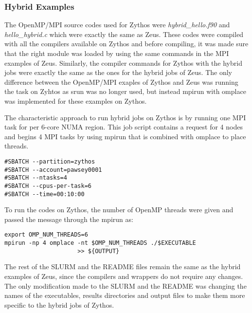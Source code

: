 \subsubsection{Hybrid Examples}

The OpenMP/MPI source codes used for Zythos were \emph{hybrid\_hello.f90} and \emph{hello\_hybrid.c} which were exactly the same as Zeus. These codes 
were compiled with all the compilers available on Zythos and before compiling, it was made sure that the right module was loaded by using the same 
commands in the MPI examples of Zeus. Similarly, the compiler commands for Zythos with the hybrid jobs were exactly the same as the ones for the hybrid 
jobs of Zeus. The only difference between the OpenMP/MPI exaples of Zythos and Zeus was running the task on Zyhtos as srun was no longer used, but 
instead mpirun with omplace was implemented for these examples on Zythos. 

The characteristic approach to run hybrid jobs on Zythos is by running one MPI task for per 6-core NUMA region. This job script contains a request for 4
nodes and begins 4 MPI tasks by using mpirun that is combined with omplace to place threads.

\begin{tcolorbox}
\begin{Verbatim}[fontsize=\scriptsize]
#SBATCH --partition=zythos
#SBATCH --account=pawsey0001
#SBATCH --ntasks=4
#SBATCH --cpus-per-task=6
#SBATCH --time=00:10:00
\end{Verbatim}
\end{tcolorbox}

To run the codes on Zythos, the number of OpenMP threads were given and passed the message through the mpirun as:

\begin{tcolorbox}
\begin{Verbatim}[fontsize=\scriptsize]
export OMP_NUM_THREADS=6
mpirun -np 4 omplace -nt $OMP_NUM_THREADS ./$EXECUTABLE
					 >> ${OUTPUT}
\end{Verbatim}
\end{tcolorbox}

The rest of the SLURM and the README files remain the same as the hybrid examples of Zeus, since the compilers and wrappers do not require any changes.
The only modification made to the SLURM and the README was changing the names of the executables, results directories and output files to make them more
specific to the hybrid jobs of Zythos.

